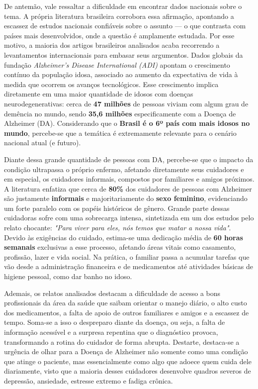 \documentclass[11pt,a4paper]{article}
\begin{document}
De antemão, vale ressaltar a dificuldade em encontrar dados nacionais sobre o tema. A própria literatura brasileira corrobora essa afirmação, apontando a escassez de estudos nacionais confiáveis sobre o assunto — o que contrasta com países mais desenvolvidos, onde a questão é amplamente estudada. Por esse motivo, a maioria dos artigos brasileiros analisados acaba recorrendo a levantamentos internacionais para embasar seus argumentos. Dados globais da fundação \textit{Alzheimer's Disease International (ADI)} apontam o crescimento contínuo da população idosa, associado ao aumento da expectativa de vida à medida que ocorrem os avanços tecnológicos. Esse crescimento implica diretamente em uma maior quantidade de idosos com doenças neurodegenerativas: cerca de \textbf{47 milhões} de pessoas viviam com algum grau de demência no mundo, sendo \textbf{35,6 milhões} especificamente com a Doença de Alzheimer (DA). Considerando que o \textbf{Brasil é o 6º país com mais idosos no mundo}, percebe-se que a temática é extremamente relevante para o cenário nacional atual (e futuro).

Diante dessa grande quantidade de pessoas com DA, percebe-se que o impacto da condição ultrapassa o próprio enfermo, afetando diretamente seus cuidadores e em especial, os cuidadores informais, compostos por familiares e amigos próximos. A literatura enfatiza que cerca de \textbf{80\%} dos cuidadores de pessoas com Alzheimer são justamente \textbf{informais} e majoritariamente do \textbf{sexo feminino}, evidenciando um forte paralelo com os papéis históricos de gênero. Grande parte dessas cuidadoras sofre com uma sobrecarga intensa, sintetizada em um dos estudos pelo relato chocante: \textit{"Para viver para eles, nós temos que matar a nossa vida"}. Devido às exigências do cuidado, estima-se uma dedicação média de \textbf{60 horas semanais} exclusivas a esse processo, afetando áreas vitais como casamento, profissão, lazer e vida social. Na prática, o familiar passa a acumular tarefas que vão desde a administração financeira e de medicamentos até atividades básicas de higiene pessoal, como dar banho no idoso.

Ademais, os relatos analisados destacam a dificuldade de acesso a bons profissionais da área da saúde que saibam orientar o manejo diário, o alto custo dos medicamentos, a falta de apoio de outros familiares e amigos e a escassez de tempo. Soma-se a isso o despreparo diante da doença, ou seja, a falta de informação acessível e a surpresa repentina que o diagnóstico provoca, transformando a rotina do cuidador de forma abrupta. Destarte, destaca-se a urgência de olhar para a Doença de Alzheimer não somente como uma condição que atinge o paciente, mas essencialmente como algo que adoece quem cuida dele diariamente, visto que a maioria desses cuidadores desenvolve quadros severos de depressão, ansiedade, estresse extremo e fadiga crônica.
\end{document}
